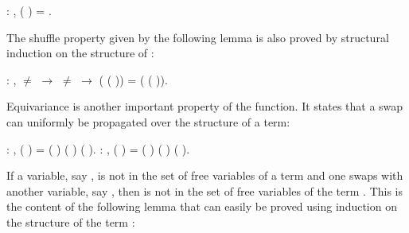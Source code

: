 \begin{coqdoccode}
\coqdocemptyline
\coqdocnoindent
{}  : \coqdockw{\ensuremath{\forall}}   ,    (   ) = .\coqdoceol
\coqdocemptyline
\end{coqdoccode}
The shuffle property given by the following lemma is also proved by structural induction on the structure of :
\begin{coqdoccode}
\coqdocnoindent
{}  : \coqdockw{\ensuremath{\forall}}    ,\coqdoceol
\coqdocindent{2.00em}
 \ensuremath{\not=}  \ensuremath{\rightarrow}  \ensuremath{\not=}  \ensuremath{\rightarrow}\coqdoceol
\coqdocindent{2.00em}
(   (   )) = (   (   )).\coqdoceol
\coqdocemptyline
\coqdocemptyline
\end{coqdoccode}
Equivariance is another important property of the  function. It states that a swap can uniformly be propagated over the structure of a term:
\begin{coqdoccode}
\coqdocemptyline
\coqdocnoindent
{}  : \coqdockw{\ensuremath{\forall}}     ,    (   ) =  (   ) (   ) (   ).\coqdoceol
\coqdocemptyline
\coqdocnoindent
{}  : \coqdockw{\ensuremath{\forall}}     ,    (   ) =  (   ) (   ) (   ).\coqdoceol
\coqdocemptyline
\end{coqdoccode}
If a variable, say , is not in the set of free variables of a term  and one swaps  with another variable, say , then  is not in the set of free variables of the term . This is the content of the following lemma that can easily be proved using induction on the structure of the term :
